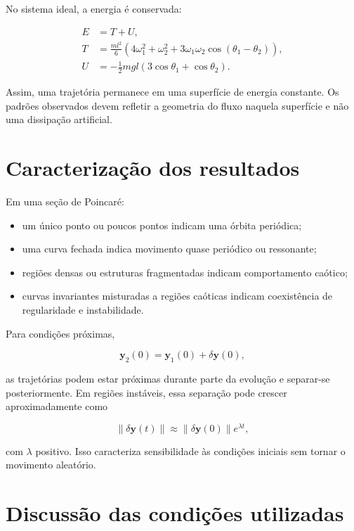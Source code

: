 \documentclass[12pt,a4paper]{article}
\begin{document}
No sistema ideal, a energia é conservada:

\begin{align}
E&=T+U,\\
T&=\frac{ml^2}{6}\left(4\omega_1^2+\omega_2^2
+3\omega_1\omega_2\cos(\theta_1-\theta_2)\right),\\
U&=-\frac12mgl\left(3\cos\theta_1+\cos\theta_2\right).
\end{align}

Assim, uma trajetória permanece em uma superfície de energia constante. Os padrões observados devem refletir a geometria do fluxo naquela superfície e não uma dissipação artificial.

\section{Caracterização dos resultados}

Em uma seção de Poincaré:

\begin{itemize}
    \item um único ponto ou poucos pontos indicam uma órbita periódica;
    \item uma curva fechada indica movimento quase periódico ou ressonante;
    \item regiões densas ou estruturas fragmentadas indicam comportamento caótico;
    \item curvas invariantes misturadas a regiões caóticas indicam coexistência de regularidade e instabilidade.
\end{itemize}

Para condições próximas,

\begin{equation}
\mathbf y_2(0)=\mathbf y_1(0)+\delta\mathbf y(0),
\end{equation}

as trajetórias podem estar próximas durante parte da evolução e separar-se posteriormente. Em regiões instáveis, essa separação pode crescer aproximadamente como

\begin{equation}
\|\delta\mathbf y(t)\|
\approx
\|\delta\mathbf y(0)\|e^{\lambda t},
\end{equation}

com $\lambda$ positivo. Isso caracteriza sensibilidade às condições iniciais sem tornar o movimento aleatório.

\section{Discussão das condições utilizadas}
\end{document}
